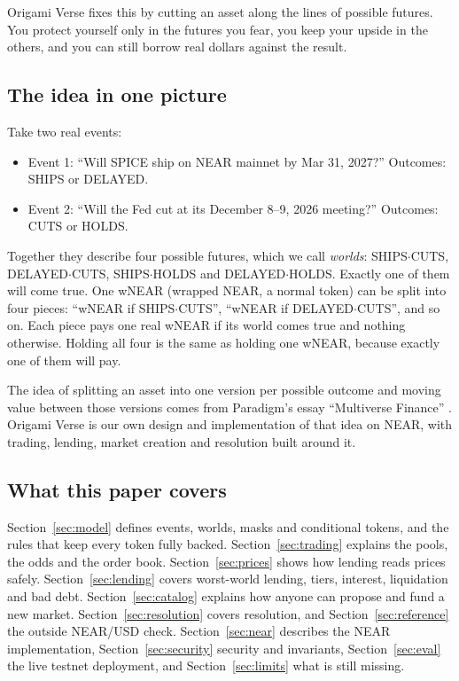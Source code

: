 \documentclass[11pt,a4paper]{article}
\newcommand{\wSC}{\textsf{SHIPS$\cdot$CUTS}}
\newcommand{\wDC}{\textsf{DELAYED$\cdot$CUTS}}
\newcommand{\wSH}{\textsf{SHIPS$\cdot$HOLDS}}
\newcommand{\wDH}{\textsf{DELAYED$\cdot$HOLDS}}
\begin{document}
Origami Verse fixes this by cutting an asset along the lines of possible futures. You protect yourself only in the futures
you fear, you keep your upside in the others, and you can still borrow real dollars against the result.

\subsection{The idea in one picture}

Take two real events:
\begin{itemize}
  \item Event 1: ``Will SPICE ship on NEAR mainnet by Mar 31, 2027?'' Outcomes: \textsf{SHIPS} or \textsf{DELAYED}.
  \item Event 2: ``Will the Fed cut at its December 8--9, 2026 meeting?'' Outcomes: \textsf{CUTS} or \textsf{HOLDS}.
\end{itemize}
Together they describe four possible futures, which we call \emph{worlds}: \wSC, \wDC, \wSH{} and \wDH.
Exactly one of them will come true. One wNEAR (wrapped NEAR, a normal token) can be split into four pieces:
``wNEAR if \wSC'', ``wNEAR if \wDC'', and so on. Each piece pays one real wNEAR if its world comes true and
nothing otherwise. Holding all four is the same as holding one wNEAR, because exactly one of them will pay.

The idea of splitting an asset into one version per possible outcome and moving value between those versions comes
from Paradigm's essay ``Multiverse Finance'' \cite{white2025}. Origami Verse is our own design and implementation of
that idea on NEAR, with trading, lending, market creation and resolution built around it.

\subsection{What this paper covers}

Section~\ref{sec:model} defines events, worlds, masks and conditional tokens, and the rules that keep every token
fully backed. Section~\ref{sec:trading} explains the pools, the odds and the order book. Section~\ref{sec:prices}
shows how lending reads prices safely. Section~\ref{sec:lending} covers worst-world lending, tiers, interest,
liquidation and bad debt. Section~\ref{sec:catalog} explains how anyone can propose and fund a new market.
Section~\ref{sec:resolution} covers resolution, and Section~\ref{sec:reference} the outside NEAR/USD check.
Section~\ref{sec:near} describes the NEAR implementation, Section~\ref{sec:security} security and invariants,
Section~\ref{sec:eval} the live testnet deployment, and Section~\ref{sec:limits} what is still missing.
\end{document}
